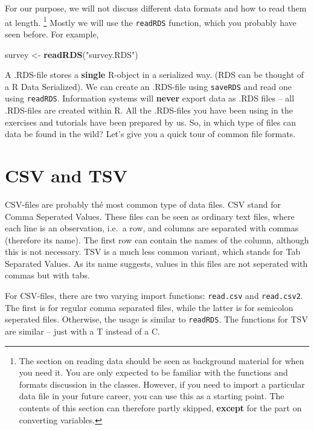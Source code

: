 \documentclass[]{tufte-book}
\newenvironment{Shaded}{}{}
\newcommand{\KeywordTok}[1]{\textcolor[rgb]{0.00,0.44,0.13}{\textbf{#1}}}
\newcommand{\StringTok}[1]{\textcolor[rgb]{0.25,0.44,0.63}{#1}}
\newcommand{\NormalTok}[1]{#1}
\begin{document}
For our purpose, we will not discuss different data formats and how to
read them at length. \footnote{The section on reading data should be
  seen as background material for when you need it. You are only
  expected to be familiar with the functions and formats discussion in
  the classes. However, if you need to import a particular data file in
  your future career, you can use this as a starting point. The contents
  of this section can therefore partly skipped, \textbf{except} for the
  part on converting variables.} Mostly we will use the \texttt{readRDS}
function, which you probably have seen before. For example,

\begin{Shaded}
\begin{Highlighting}[]
\NormalTok{survey <-}\StringTok{ }\KeywordTok{readRDS}\NormalTok{(}\StringTok{"survey.RDS"}\NormalTok{)}
\end{Highlighting}
\end{Shaded}

A .RDS-file stores a \textbf{single} R-object in a serialized way. (RDS
can be thought of a R Data Serialized). We can create an .RDS-file using
\texttt{saveRDS} and read one using \texttt{readRDS}. Information
systems will \textbf{never} export data as .RDS files -- all .RDS-files
are created within R. All the .RDS-files you have been using in the
exercises and tutorials have been prepared by us. So, in which type of
files can data be found in the wild? Let's give you a quick tour of
common file formats.

\section{CSV and TSV}\label{csv-and-tsv}

CSV-files are probably thé most common type of data files. CSV stand for
Comma Seperated Values. These files can be seen as ordinary text files,
where each line is an observation, i.e.~a row, and columns are separated
with commas (therefore its name). The first row can contain the names of
the column, although this is not necessary. TSV is a much less common
variant, which stands for Tab Separated Values. As its name suggests,
values in this files are not seperated with commas but with tabs.

For CSV-files, there are two varying import functions: \texttt{read.csv}
and \texttt{read.csv2}. The first is for regular comma separated files,
while the latter is for semicolon seperated files. Otherwise, the usage
is similar to \texttt{readRDS}. The functions for TSV are similar --
just with a T instead of a C.
\end{document}
